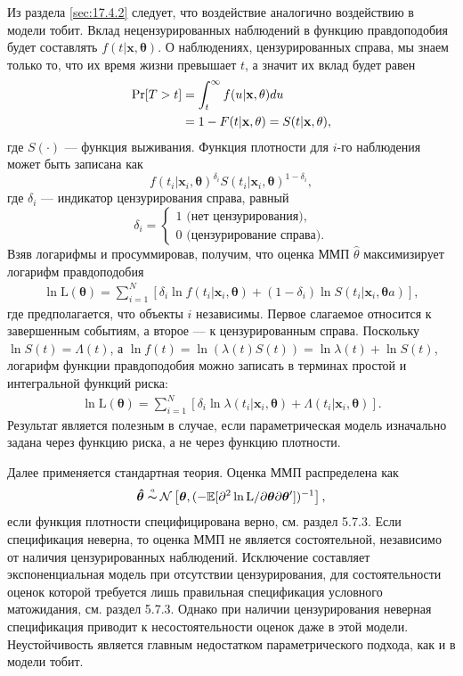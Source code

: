 Из раздела \ref{sec:17.4.2} следует, что воздействие аналогично воздействию в модели тобит. Вклад нецензурированных наблюдений в функцию правдоподобия будет составлять $f(t|\mathbf{x},\mathbf{\theta})$. О наблюдениях, цензурированных справа, мы знаем только то, что их время жизни превышает $t$, а значит их вклад будет равен
        \begin{align}
        \Pr[T>t]&=\int^{\infty}_{t}f(u|\mathbf{x},\mathbf{\theta})du\notag\\
                &=1-F(t|\mathbf{x},\theta)=S(t|\mathbf{x},\mathbf{\theta}),\notag
        \end{align}
где $S(\cdot)$ --- функция выживания. Функция плотности для $i$-го наблюдения может быть записана как
    $$f(t_i|\mathbf{x}_i,\mathbf{\theta})^{\delta_i}S(t_i|\mathbf{x}_i,\mathbf{\theta})^{1-\delta_i},$$
где $\delta_i$ --- индикатор цензурирования справа, равный
        $$\delta_i=\begin{cases}
            1 \textrm{ (нет цензурирования)},\\
            0 \textrm{ (цензурирование справа)}.
                   \end{cases}$$
Взяв логарифмы и просуммировав, получим, что  оценка ММП $\hat{\theta}$ максимизирует логарифм правдоподобия
        \begin{align}
        \label{eq:17.17}
        \ln \mathrm{L}(\mathbf{\theta})=\sum^{N}_{i=1}[\delta_i\ln f(t_i|\mathbf{x}_i,\mathbf{\theta})+(1-\delta_i)\ln S(t_i|\mathbf{x}_i,\mathbf{\theta}a)],
        \end{align}
где предполагается, что объекты $i$ независимы. Первое слагаемое относится к завершенным событиям, а второе --- к цензурированным справа. Поскольку $\ln S(t) = \Lambda(t)$, а $\ln f(t) = \ln(\lambda(t)S(t)) = \ln \lambda(t) + \ln S(t)$, логарифм функции правдоподобия можно записать в терминах простой и интегральной функций риска:
        \begin{align}
        \label{eq:17.18}
        \ln \mathrm{L}(\mathbf{\theta})=\sum^{N}_{i=1}[\delta_i\ln\lambda(t_i|\mathbf{x}_i,\mathbf{\theta})+\Lambda(t_i|\mathbf{x}_i,
        \mathbf{\theta})].
        \end{align}
Результат является полезным в случае, если параметрическая модель изначально задана через функцию риска, а не через функцию плотности.

Далее применяется стандартная теория. Оценка ММП распределена как
$$\bm{\hat{\theta}}\thicksim\!\!\!\!\!^{{}^{a}}\hspace{0.1cm}\mathcal{N}\left[\bm{\theta},(-\E[\partial^2\ln\mathrm{L}/\partial\bm{\theta}\partial\bm{\theta}'])^{-1} \right],$$
если функция плотности специфицирована верно, см. раздел 5.7.3. %
Если спецификация неверна, то оценка ММП не является состоятельной, независимо от наличия цензурированных наблюдений. Исключение составляет экспоненциальная модель при отсутствии цензурирования, для состоятельности оценок которой требуется лишь правильная спецификация условного матожидания, см. раздел 5.7.3. %
Однако при наличии цензурирования неверная спецификация приводит к несостоятельности оценок даже в этой модели. Неустойчивость является главным недостатком параметрического подхода, как и в модели тобит.

